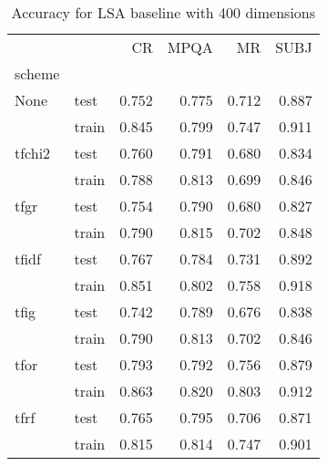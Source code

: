\begin{table}[H]
\begin{center}

\begin{tabular}{llrrrr}
\toprule
{} &      &  CR &  MPQA &  MR &  SUBJ \\
scheme &  &            &              &            &              \\
\midrule
None & test &      0.752 &        0.775 &      0.712 &        0.887 \\
{} & train &      0.845 &        0.799 &      0.747 &        0.911 \\
tfchi2 & test &      0.760 &        0.791 &      0.680 &        0.834 \\
{} & train &      0.788 &        0.813 &      0.699 &        0.846 \\
tfgr & test &      0.754 &        0.790 &      0.680 &        0.827 \\
{} & train &      0.790 &        0.815 &      0.702 &        0.848 \\
tfidf & test &      0.767 &        0.784 &      0.731 &        0.892 \\
{} & train &      0.851 &        0.802 &      0.758 &        0.918 \\
tfig & test &      0.742 &        0.789 &      0.676 &        0.838 \\
{} & train &      0.790 &        0.813 &      0.702 &        0.846 \\
tfor & test &      0.793 &        0.792 &      0.756 &        0.879 \\
{} & train &      0.863 &        0.820 &      0.803 &        0.912 \\
tfrf & test &      0.765 &        0.795 &      0.706 &        0.871 \\
{} & train &      0.815 &        0.814 &      0.747 &        0.901 \\
\bottomrule
\end{tabular}

\caption[Accuracy for LSA baseline with 400 dimensions]{Accuracy for LSA baseline with 400 dimensions}
\label{tab:lsa:resuts:abs:400}
\end{center}
\end{table}





